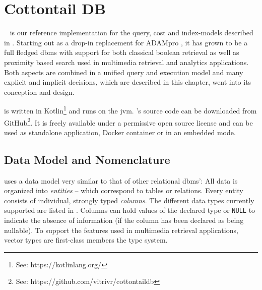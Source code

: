 \chapter{Cottontail DB}

\label{chapter:cottontaildb}

\cottontail{}~\cite{Gasser:2020Cottontail} is our reference implementation for the query, cost and index-models described in . Starting out as a drop-in replacement for ADAMpro \cite{Giangreco:2016Adam}, it has grown to be a full fledged \acrshort{dbms} with support for both classical boolean retrieval as well as proximity based search used in multimedia retrieval and analytics applications. Both aspects are combined in a unified query and execution model and many explicit and implicit decisions, which are described in this chapter, went into its conception and design.

\cottontail{} is written in Kotlin\footnote{See: https://kotlinlang.org/} and runs on the \acrfull{jvm}. \cottontail{}'s source code can be downloaded from GitHub\footnote{See: https://github.com/vitrivr/cottontaildb}. It is freely available under a permissive open source license and can be used as standalone application, Docker container or in an embedded mode.

\section{Data Model and Nomenclature} 

\cottontail{} uses a data model very similar to that of other relational \acrshort{dbms}': All data is organized into \emph{entities} -- which correspond to tables or relations. Every entity consists of individual, strongly typed \emph{columns}. The different data types currently supported are listed in . Columns can hold values of the declared type or \texttt{NULL} to indicate the absence of information (if the column has been declared as being nullable). To support the features used in multimedia retrieval applications, vector types are first-class members the type system.

